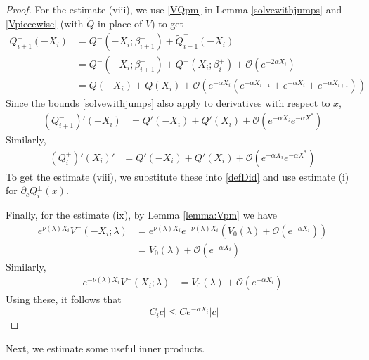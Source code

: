 \documentclass[thesis.tex]{subfiles}
\begin{document}
\begin{lemma}
\begin{proof}
For the estimate (viii), we use \eqref{VQpm} in Lemma \ref{solvewithjumps} and \eqref{Vpiecewise} (with $\tilde{Q}$ in place of $V$) to get
\begin{align*}
Q_{i+1}^-(-X_i) &= Q^-(-X_i; \beta_{i+1}^-) + \tilde{Q}_{i+1}^-(-X_i) \\
&= Q^-(-X_i; \beta_{i+1} ^-) + Q^+(X_i; \beta_i^+) + \mathcal{O}(e^{-2 \alpha X_i}) \\
&= Q(-X_i) + Q(X_i) 
+ \mathcal{O}(e^{-\alpha X_i}(e^{-\alpha X_{i-1}}+e^{-\alpha X_i}+e^{-\alpha X_{i+1}}))
\end{align*}
Since the bounds \ref{solvewithjumps} also apply to derivatives with respect to $x$, 
\begin{align*}
(Q_{i+1}^-)'(-X_i) &= Q'(-X_i) + Q'(X_i) + \mathcal{O}(e^{-\alpha X_i}e^{-\alpha X^*})
\end{align*}
Similarly,
\begin{align*}
(Q_i^+)'(X_i)' &= Q'(-X_i) + Q'(X_i) + \mathcal{O}(e^{-\alpha X_i}e^{-\alpha X^*})
\end{align*}
To get the estimate (viii), we substitute these into \cref{defDid} and use estimate (i) for $\partial_c Q_i^\pm(x)$.

Finally, for the estimate (ix), by Lemma \ref{lemma:Vpm} we have
\begin{align*}
e^{\nu(\lambda) X_i} V^-(-X_i; \lambda) 
&= e^{\nu(\lambda) X_i} e^{-\nu(\lambda) X_i}\left(V_0(\lambda) + \mathcal{O}(e^{-\alpha X_i}) \right) \\
&= V_0(\lambda) + \mathcal{O}(e^{-\alpha X_i})
\end{align*}
Similarly,
\begin{align*}
e^{-\nu(\lambda) X_i} V^+(X_i; \lambda)
&= V_0(\lambda) + \mathcal{O}(e^{-\alpha X_i})
\end{align*}
Using these, it follows that
\[
|C_i c| \leq C e^{-\alpha X_i} |c|
\]
\end{proof}
\end{lemma}

Next, we estimate some useful inner products.
\end{document}
